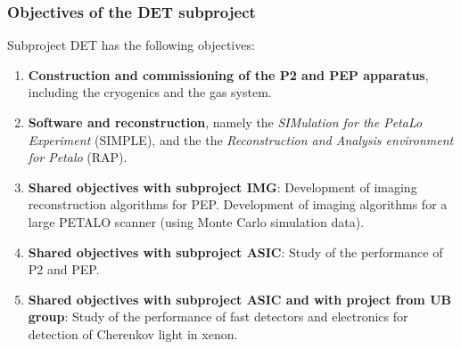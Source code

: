 \subsubsection*{Objectives of the DET subproject}
Subproject DET has the following objectives:
\begin{enumerate}
\item {\bf Construction and commissioning of the P2 and PEP apparatus}, including the cryogenics and the gas system.
\item {\bf Software and reconstruction}, namely the {\em SIMulation for the PetaLo Experiment} (SIMPLE), and the the {\em Reconstruction and Analysis environment for Petalo} (RAP). 
\item {\bf Shared objectives with subproject IMG}: Development of imaging reconstruction algorithms for PEP. Development of imaging algorithms for a large PETALO scanner (using Monte Carlo simulation data).
\item {\bf Shared objectives with subproject ASIC}: Study of the performance of P2 and PEP. 
\item {\bf Shared objectives with subproject ASIC and with project from UB group}: Study of the performance of fast detectors and electronics for detection of Cherenkov light in xenon. 
\end{enumerate}



